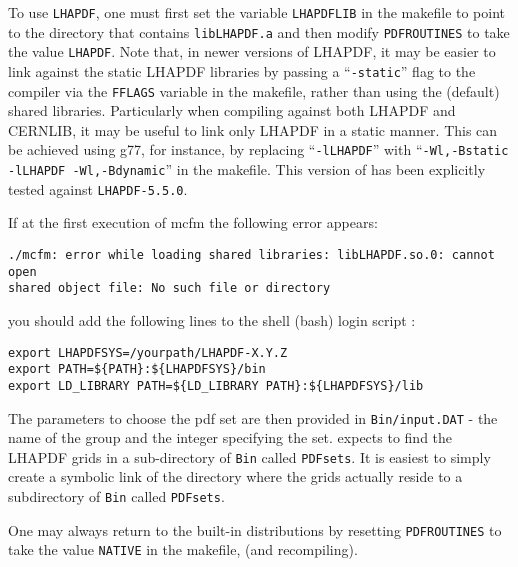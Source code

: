 \documentclass[12pt]{article}
\begin{document}
To use {\tt LHAPDF}, one must first set the variable {\tt LHAPDFLIB}
in the makefile to point to the directory that contains
{\tt libLHAPDF.a} and then modify {\tt PDFROUTINES} to
take the value {\tt LHAPDF}. Note that, in newer versions of LHAPDF,
it may be easier to link against the static LHAPDF libraries by passing
a ``{\tt -static}'' flag to the compiler via the {\tt FFLAGS} variable
in the makefile, rather than using the (default) shared libraries.
Particularly when compiling against both LHAPDF and CERNLIB, it may
be useful to link only LHAPDF in a static manner. This can be achieved
using g77, for instance, by replacing
 ``{\tt -lLHAPDF}'' with ``{\tt -Wl,-Bstatic -lLHAPDF -Wl,-Bdynamic}''
in the makefile. This version of \MCFM has been explicitly tested
against {\tt LHAPDF-5.5.0}.

If at the first execution of mcfm the following error appears:
\begin{verbatim}
./mcfm: error while loading shared libraries: libLHAPDF.so.0: cannot open
shared object file: No such file or directory
\end{verbatim}

you should add the following lines to the shell (bash) login script :
\begin{verbatim}
export LHAPDFSYS=/yourpath/LHAPDF-X.Y.Z
export PATH=${PATH}:${LHAPDFSYS}/bin
export LD_LIBRARY PATH=${LD_LIBRARY PATH}:${LHAPDFSYS}/lib
\end{verbatim}

The parameters to choose the
pdf set are then provided in {\tt Bin/input.DAT} - 
the name of the group and the integer specifying 
the set.
\MCFM expects to find the LHAPDF grids in a sub-directory of {\tt Bin} called
{\tt PDFsets}. It is easiest to simply create a symbolic link of the directory where the
grids actually reside to a subdirectory of {\tt Bin} called {\tt PDFsets}.

One may always return to the built-in distributions by resetting
{\tt PDFROUTINES} to take the value {\tt NATIVE}  in the makefile,
(and recompiling).
\end{document}
